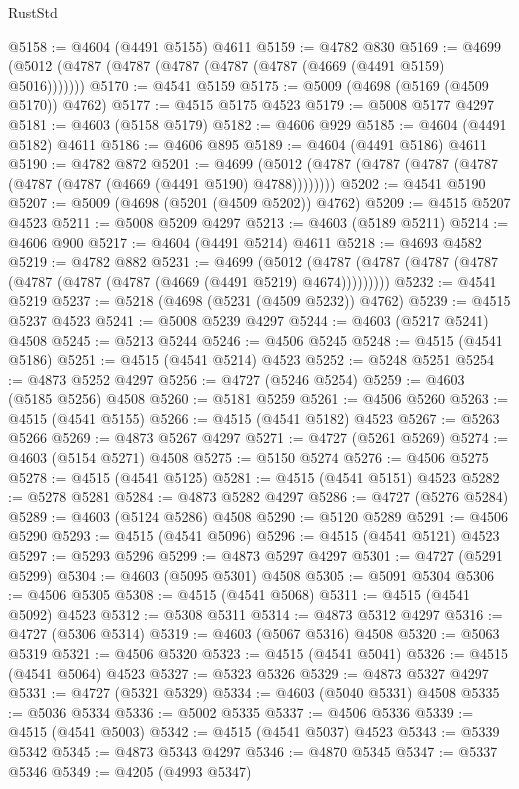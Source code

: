 \begin{lexlean}{RustStd}
\begin{coremodule}
@5158 := @4604 (@4491 @5155) @4611
@5159 := @4782 @830
@5169 := @4699 (@5012 (@4787 (@4787 (@4787 (@4787 (@4787 (@4669 (@4491 @5159) @5016)))))))
@5170 := @4541 @5159
@5175 := @5009 (@4698 (@5169 (@4509 @5170)) @4762)
@5177 := @4515 @5175 @4523
@5179 := @5008 @5177 @4297
@5181 := @4603 (@5158 @5179)
@5182 := @4606 @929
@5185 := @4604 (@4491 @5182) @4611
@5186 := @4606 @895
@5189 := @4604 (@4491 @5186) @4611
@5190 := @4782 @872
@5201 := @4699 (@5012 (@4787 (@4787 (@4787 (@4787 (@4787 (@4787 (@4669 (@4491 @5190) @4788))))))))
@5202 := @4541 @5190
@5207 := @5009 (@4698 (@5201 (@4509 @5202)) @4762)
@5209 := @4515 @5207 @4523
@5211 := @5008 @5209 @4297
@5213 := @4603 (@5189 @5211)
@5214 := @4606 @900
@5217 := @4604 (@4491 @5214) @4611
@5218 := @4693 @4582
@5219 := @4782 @882
@5231 := @4699
    (@5012 (@4787 (@4787 (@4787 (@4787 (@4787 (@4787 (@4787 (@4669 (@4491 @5219) @4674)))))))))
@5232 := @4541 @5219
@5237 := @5218 (@4698 (@5231 (@4509 @5232)) @4762)
@5239 := @4515 @5237 @4523
@5241 := @5008 @5239 @4297
@5244 := @4603 (@5217 @5241) @4508
@5245 := @5213 @5244
@5246 := @4506 @5245
@5248 := @4515 (@4541 @5186)
@5251 := @4515 (@4541 @5214) @4523
@5252 := @5248 @5251
@5254 := @4873 @5252 @4297
@5256 := @4727 (@5246 @5254)
@5259 := @4603 (@5185 @5256) @4508
@5260 := @5181 @5259
@5261 := @4506 @5260
@5263 := @4515 (@4541 @5155)
@5266 := @4515 (@4541 @5182) @4523
@5267 := @5263 @5266
@5269 := @4873 @5267 @4297
@5271 := @4727 (@5261 @5269)
@5274 := @4603 (@5154 @5271) @4508
@5275 := @5150 @5274
@5276 := @4506 @5275
@5278 := @4515 (@4541 @5125)
@5281 := @4515 (@4541 @5151) @4523
@5282 := @5278 @5281
@5284 := @4873 @5282 @4297
@5286 := @4727 (@5276 @5284)
@5289 := @4603 (@5124 @5286) @4508
@5290 := @5120 @5289
@5291 := @4506 @5290
@5293 := @4515 (@4541 @5096)
@5296 := @4515 (@4541 @5121) @4523
@5297 := @5293 @5296
@5299 := @4873 @5297 @4297
@5301 := @4727 (@5291 @5299)
@5304 := @4603 (@5095 @5301) @4508
@5305 := @5091 @5304
@5306 := @4506 @5305
@5308 := @4515 (@4541 @5068)
@5311 := @4515 (@4541 @5092) @4523
@5312 := @5308 @5311
@5314 := @4873 @5312 @4297
@5316 := @4727 (@5306 @5314)
@5319 := @4603 (@5067 @5316) @4508
@5320 := @5063 @5319
@5321 := @4506 @5320
@5323 := @4515 (@4541 @5041)
@5326 := @4515 (@4541 @5064) @4523
@5327 := @5323 @5326
@5329 := @4873 @5327 @4297
@5331 := @4727 (@5321 @5329)
@5334 := @4603 (@5040 @5331) @4508
@5335 := @5036 @5334
@5336 := @5002 @5335
@5337 := @4506 @5336
@5339 := @4515 (@4541 @5003)
@5342 := @4515 (@4541 @5037) @4523
@5343 := @5339 @5342
@5345 := @4873 @5343 @4297
@5346 := @4870 @5345
@5347 := @5337 @5346
@5349 := @4205 (@4993 @5347)

\end{coremodule}
\end{lexlean}

